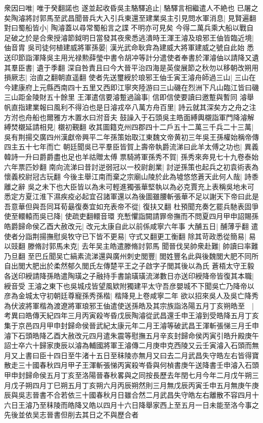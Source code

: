 衆因曰唯|{
	唯于癸翻諾也}
遂並起收昏吳主駱驛追止|{
	駱驛言相繼遣人不絶也}
已屠之矣陶濬將討郭馬至武昌聞晉兵大入引兵東還至建業吳主引見問水軍消息|{
	見賢遍翻}
對曰蜀船皆小|{
	陶濬蓋以尋常蜀船言之諜不明亦可見矣}
今得二萬兵乘大船以戰自足破之於是合衆授濬節鉞明日當發其夜衆悉逃潰時王渾王濬及琅邪王伷皆臨近境|{
	伷音胄}
吳司徒何植建威將軍孫晏|{
	漢光武命耿弇為建威大將軍建威之號自此始}
悉送印節詣渾降吳主用光禄勲薛瑩中書令胡冲等計分遣使者奉書於渾濬伷以請降又遺其羣臣書|{
	遺于季翻}
深自咎責且曰今大晉平治四海是英俊展節之秋勿以移朝改朔用損厥志|{
	治直之翻朝直遥翻}
使者先送璽綬於琅邪王伷壬寅王濬舟師過三山|{
	三山在今建康府上元縣西南四十五里又西即江寧夾陸游曰三山磯在烈洲下凡山臨江皆曰磯三山距金陵財五十餘里}
王渾遣信要濬蹔過論事|{
	信即信使要讀曰邀蹔與暫同}
濬舉帆直指建業報曰風利不得泊也是日濬戎卒八萬方舟百里|{
	詩云就其深矣方之舟之注方泭也舟船也爾雅方木置水曰泭音夫}
鼓譟入于石頭吳主皓面縛輿櫬詣軍門降濬解縛焚櫬延請相見|{
	櫬初覲翻}
收其圖籍克州四郡四十二戶五十二萬三千兵二十三萬|{
	吳有荆揚交廣四州漢獻帝興平二年孫策始取江東魏文帝黄初三年吳王孫權始稱帝傳四主五十七年而亡}
朝廷聞吳已平羣臣皆賀上壽帝執爵流涕曰此羊太傅之功也|{
	異義韓詩一升曰爵爵盡也足也羊祜贈太傅}
票騎將軍孫秀不賀|{
	孫秀來奔見七十九卷泰始六年票匹妙翻}
南向流涕曰昔討逆弱冠以一校尉創業|{
	討逆孫策也起兵之初袁術表為懷義校尉冠古玩翻}
今後主舉江南而棄之宗廟山陵於此為墟悠悠蒼天此何人哉|{
	詩黍離之辭}
吳之未下也大臣皆以為未可輕進獨張華堅執以為必克賈充上表稱吳地未可悉定方夏江淮下濕疾疫必起宜召諸軍還以為後圖雖腰斬張華不足以謝天下帝曰此是吾意華但與吾同耳荀朂復奏宜如充表帝不從|{
	復扶又翻}
杜預聞充奏乞罷兵馳表固爭使至轘轅而吳已降|{
	使疏吏翻轘音環}
充慙懼詣闕請罪帝撫而不問夏四月甲申詔賜孫皓爵歸命侯乙酉大赦改元|{
	改元太康自此以前係咸寧六年事}
大酺五日|{
	酺薄乎翻}
遣使者分詣荆揚撫慰吳牧守已下皆不更易|{
	守式又翻更工衡翻}
除其苛政悉從簡易|{
	易以豉翻}
滕脩討郭馬未克|{
	去年吴主皓遣滕脩討郭馬}
聞晉伐吴帥衆赴難|{
	帥讀曰率難乃旦翻}
至巴丘聞吴亡縞素流涕還與廣州刺史閭豐|{
	閭姓豐名此與後魏閭大肥不同所自出閭大肥出於柔然郁久閭氏左傳楚平王之子啟字子閭其後以為氏}
蒼梧太守王毅各送印綬請降孫皓遣陶璜之子融持手書諭璜璜流涕數日亦送印綬降帝皆復其本職|{
	綬音受}
王濬之東下也吳城戍皆望風欵附獨建平太守吾彦嬰城不下聞吳亡乃降帝以彦為金城太守初朝廷尊寵孫秀孫楷|{
	楷降見上卷咸寧二年}
欲以招來吳人及吳亡降秀為伏波將軍楷為渡遼將軍琅邪王伷遣使送孫皓及其宗族詣洛陽五月丁亥朔皓至　|{
	考異曰皓傳天紀四年三月丙寅殺岑昏戊辰陶濬從武昌還壬申王濬到受皓降五月丁亥集于京邑四月甲申封歸命侯晉武紀太康元年二月王濬等破武昌王渾斬張悌三月壬申濬下石頭皓降乙酉大赦改元四月遣朱震等慰撫五月辛亥封歸命侯丙寅引皓升殿庚午詔士卒六十歸家庚辰以濬為輔國將軍王濬傳二月庚申克西陵又云壬寅濬入石頭而無月又上書曰臣十四日至牛渚十五日至秣陵亦無月又曰去二月武昌失守皓左右皆得寶散走三十國春秋四月甲子王渾斬張悌丙寅殺岑昏與何楨書庚午送降書壬申濬入石頭甲申封歸命侯五月丁亥至洛陽晉春秋畧與之同按長歷去年閏七月今年二月戊午朔三月戊子朔四月丁巳朔五月丁亥朔六月丙辰朔然則三月無戊辰丙寅壬申五月無庚午庚辰與吳志晉書不合若依三十國春秋月日雖合然二月武昌失守皓左右離散不容四月十六日王濬乃至秣陵而皓降又皓以四月十六日降舉家西上至五月一日未能至洛今事之先後並依吴志晉書但削去其日之不與歷合者}
